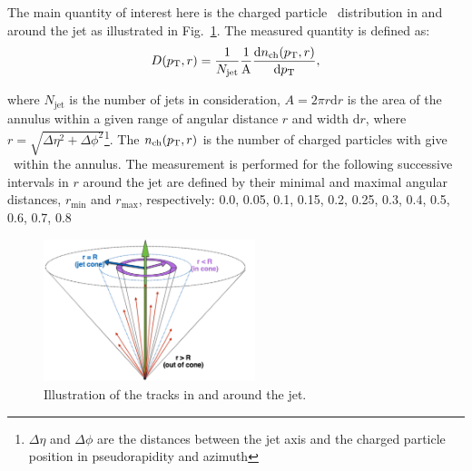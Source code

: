 
The main quantity of interest here is the charged particle \pt\ distribution in and around the jet as illustrated in Fig.~\ref{Fig:dpt_def}. The measured quantity is defined as:
  \begin{equation}
  \mbox{$D( p_{\mathrm{T}}, r)$} = \frac{1}{N_{\mathrm{jet}}} \frac{1}{\mathrm{A}} \frac{\mathrm{d} n_{\mathrm{ch}} (p_{\mathrm{T}}, r)}{\mathrm{d} p_{\mathrm{T}}},
\end{equation}

where $N_{\mathrm{jet}}$ is the number of jets in consideration, $A = 2\pi r \text{d}r$ is the area of the annulus within a given range of angular distance $r$ and width $\text{d}r$, where $r = \sqrt{\Delta \eta^2 + \Delta \phi^2}$\footnote{$\Delta \eta$ and $\Delta \phi$ are the distances between the jet axis and the charged particle position in pseudorapidity and azimuth}. The $n_{\mathrm{ch}}(p_{\mathrm{T}}, r)$ is the number of charged particles with give \pt\ within the annulus. The measurement is performed for the following successive intervals in $r$ around the jet are defined by their minimal and maximal angular distances, $r_{\textrm{min}}$ and $r_{\textrm{max}}$, respectively: 0.0, 0.05, 0.1, 0.15, 0.2, 0.25, 0.3, 0.4, 0.5, 0.6, 0.7, 0.8

\begin{figure}
\centerline{
\includegraphics[width=0.55\textwidth]{figures_general/fragScheme_Shape.pdf} }
\caption{Illustration of the tracks in and around the jet. }
\label{Fig:dpt_def}
\end{figure}


